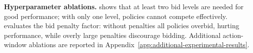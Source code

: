 \textbf{Hyperparameter ablations.}\quad {} shows that at least two bid levels are needed for good performance; with only one level, policies cannot compete effectively.  evaluates the bid penalty factor: without penalties all policies overbid, hurting performance, while overly large penalties discourage bidding. Additional action-window ablations are reported in Appendix~\ref{app:additional-experimental-results}.
